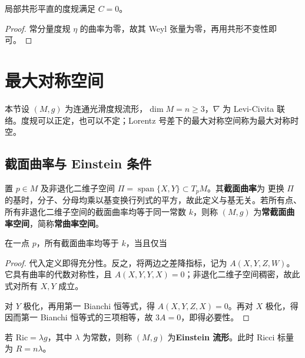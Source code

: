 \begin{corollary}
    局部共形平直的度规满足 $C=0$。
\end{corollary}
\begin{proof}
    常分量度规 $\eta$ 的曲率为零，故其 Weyl 张量为零，再用共形不变性即可。
\end{proof}

\section{最大对称空间}

本节设 $(M,g)$ 为连通光滑度规流形，$\dim M=n\geqslant3$，$\nabla$ 为 Levi-Civita 联络。度规可以正定，也可以不定；Lorentz 号差下的最大对称空间称为最大对称时空。

\subsection{截面曲率与 Einstein 条件}

\begin{definition}
    置 $p\in M$ 及非退化二维子空间 $\Pi=\operatorname{span}\{X,Y\}\subset T_pM$。其\textbf{截面曲率}为
    更换 $\Pi$ 的基时，分子、分母均乘以基变换行列式的平方，故此定义与基无关。若所有点、所有非退化二维子空间的截面曲率均等于同一常数 $k$，则称 $(M,g)$ 为\textbf{常截面曲率空间}，简称\textbf{常曲率空间}。
\end{definition}

\begin{theorem}
    在一点 $p$，所有截面曲率均等于 $k$，当且仅当
\end{theorem}
\begin{proof}
    代入定义即得充分性。反之，将两边之差降指标，记为 $A(X,Y,Z,W)$。它具有曲率的代数对称性，且 $A(X,Y,Y,X)=0$；非退化二维子空间稠密，故此式对所有 $X,Y$ 成立。

    对 $Y$ 极化，再用第一 Bianchi 恒等式，得 $A(X,Y,Z,X)=0$。再对 $X$ 极化，得
    因而第一 Bianchi 恒等式的三项相等，故 $3A=0$，即得必要性。
\end{proof}

\begin{definition}
    若 $\mathrm{Ric}=\lambda g$，其中 $\lambda$ 为常数，则称 $(M,g)$ 为\textbf{Einstein 流形}。此时 Ricci 标量为 $R=n\lambda$。
\end{definition}

